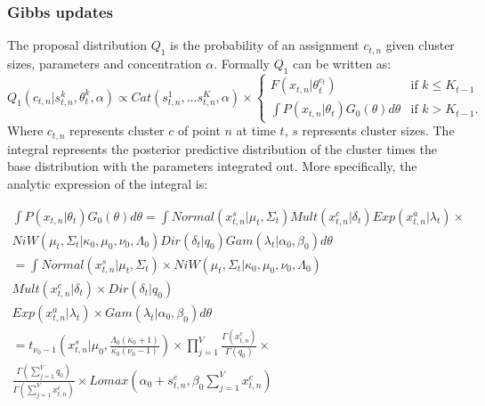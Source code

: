 \documentclass [twoside,hidelinks]{article}
\begin{document}
\subsubsection{Gibbs updates}
\label{gibbsUpd}
The proposal distribution $Q_1$ is the probability of an assignment $c_{t,n}$ given cluster sizes, parameters and concentration $\alpha$. Formally $Q_1$ can be written as:
\begin{equation} \label{Gibbs}
 Q_1 (c_{t,n} | s_{t,n}^k, \theta_t^k, \alpha) \propto Cat ( s_{t,n}^1,...s_{t,n}^K, \alpha ) \times
 	\begin{cases} 
 	F (x_{t,n} | \theta_t^{c_t} )  &\mbox{if } k \leq K_{t-1} \\
 	\int P (x_{t,n} | \theta_t )G_0 (\theta) d\theta & \mbox{if } k > K_{t-1}. \end{cases}
\end{equation}
Where $c_{t,n}$ represents cluster $c$ of point $n$ at time $t$, $s$ represents cluster sizes. The integral represents the posterior predictive distribution of the cluster times the base distribution with the parameters integrated out. More specifically, the analytic expression of the integral is:


\begin{equation} \label{Q1}
	\begin{split}
		 	\int P (x_{t,n} | \theta_t )G_0 (\theta) d\theta =
		 	\int Normal (x_{t,n}^s| \mu_t, \Sigma_t) Mult (x_{t,n}^c | \delta_t) Exp (x_{t,n}^a | \lambda_t) \times  \\ NiW ( \mu_t, \Sigma_t | \kappa_0, \mu_0, \nu_0, \Lambda_0 ) Dir (\delta_t | q_0) Gam ( \lambda_t | \alpha_0, \beta_0)  d\theta  \\
			= \int Normal (x_{t,n}^s| \mu_t, \Sigma_t) \times NiW ( \mu_t, \Sigma_t | \kappa_0, \mu_0, \nu_0, \Lambda_0 )\\
			 Mult (x_{t,n}^c | \delta_t) \times Dir (\delta_t | q_0) \\
			 Exp (x_{t,n}^a | \lambda_t) \times Gam ( \lambda_t | \alpha_0, \beta_0)  d\theta  \\
		 	= t_{\nu_0-1} ( x_{t,n}^s | \mu_0, \frac{\Lambda_0 (\kappa_0+1)}{\kappa_0 (\nu_0-1)}) \times \prod_{j=1}^V \frac{\Gamma (x_{t,n}^c)}{\Gamma (q_0)} \times \\ \frac{\Gamma (\sum_{j=1}^V q_0)}{\Gamma (\sum_{j=1}^V x_{t,n}^c)} \times Lomax (\alpha_0 + s_{t,n}^c, \beta_0 \sum_{j=1}^V x_{t,n}^c)
 	\end{split}
\end{equation}
\end{document}
